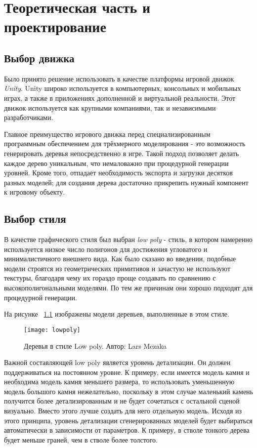 \chapter{Теоретическая часть и проектирование}
\section{Выбор движка}
Было принято решение использовать в качестве платформы игровой движок \emph{Unity}. Unity широко используется в компьютерных, консольных и мобильных играх, а также в приложениях дополненной и виртуальной реальности. Этот движок используется как крупными компаниями, так и независимыми разработчиками.

Главное преимущество игрового движка перед специализированным программным обеспечением для трёхмерного моделирования - это возможность генерировать деревья непосредственно в игре. Такой подход позволяет делать каждое дерево уникальным, что немаловажно при процедурной генерации уровней. Кроме того, отпадает необходимость экспорта и загрузки десятков разных моделей; для создания дерева достаточно прикрепить нужный компонент к игровому объекту. 

\section{Выбор стиля}
В качестве графического стиля был выбран \emph{low poly} - стиль, в котором намеренно используется низкое число полигонов для достижения угловатого и минималистичного внешнего вида. Как было сказано во введении, подобные модели строятся из геометрических примитивов и зачастую не используют текстуры, благодаря чему их гораздо проще создавать по сравнению с высокополигональными моделями. По тем же причинам они хорошо подходят для процедурной генерации. 

На рисунке ~\ref{fig:lowpoly} изображены модели деревьев, выполненные в этом стиле.

\begin{figure}[h]
    \centering
    \texttt{[image: lowpoly]}
    \caption{Деревья в стиле Low poly. Автор: Lars Mezaka}
    \label{fig:lowpoly}
\end{figure}

Важной составляющей low poly является уровень детализации. Он должен поддерживаться на постоянном уровне. К примеру, если имеется модель камня и необходима модель камня меньшего размера, то использовать уменьшенную модель большого камня нежелательно, поскольку в этом случае маленький камень получится более детализированным и не будет сочетаться с остальной сценой визуально. Вместо этого лучше создать для него отдельную модель. Исходя из этого принципа, уровень детализации сгенерированных моделей будет выбираться автоматически в зависимости от параметров. К примеру, в стволе тонкого дерева будет меньше граней, чем в стволе более толстого.

